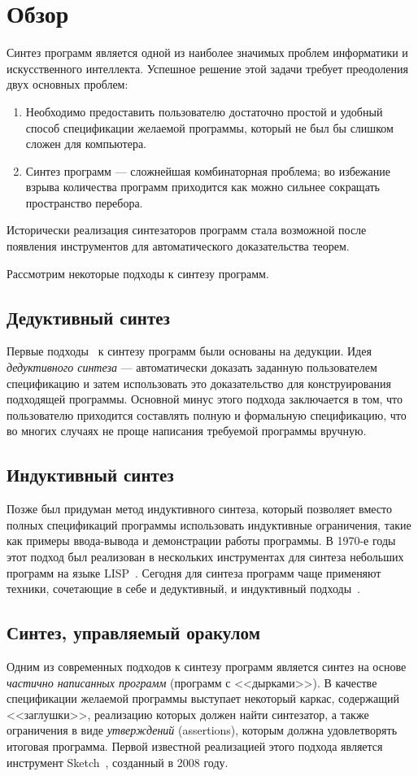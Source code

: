 \documentclass[14pt]{matmex-diploma-custom}
\begin{document}
\section{Обзор}
Синтез программ является одной из наиболее значимых проблем информатики и искусственного интеллекта. Успешное решение этой задачи требует преодоления двух основных проблем:
\begin{enumerate}
    \item Необходимо предоставить пользователю достаточно простой и удобный способ спецификации желаемой программы, который не был бы слишком сложен для компьютера.
    \item Синтез программ --- сложнейшая комбинаторная проблема; во избежание взрыва количества программ приходится как можно сильнее сокращать пространство перебора.
\end{enumerate}

Исторически реализация синтезаторов программ стала возможной после появления инструментов для автоматического доказательства теорем.

Рассмотрим некоторые подходы к синтезу программ.

\subsection{Дедуктивный синтез}
Первые подходы~\cite{deductive1, Zohar} к синтезу программ были основаны на дедукции. Идея \emph{дедуктивного синтеза} --- автоматически доказать заданную пользователем спецификацию и затем использовать это доказательство для конструирования подходящей программы. Основной минус этого подхода заключается в том, что пользователю приходится составлять полную и формальную спецификацию, что во многих случаях не проще написания требуемой программы вручную.

\subsection{Индуктивный синтез}
Позже был придуман метод индуктивного синтеза, который позволяет вместо полных спецификаций программы использовать индуктивные ограничения, такие как примеры ввода-вывода и демонстрации работы программы. В 1970-е годы этот подход был реализован в нескольких инструментах для синтеза небольших программ на языке LISP~\cite{Shaw}. Сегодня для синтеза программ чаще применяют техники, сочетающие в себе и дедуктивный, и индуктивный подходы~\cite{ProgramSynthesis}.

\subsection{Синтез, управляемый оракулом}
Одним из современных подходов к синтезу программ является синтез на основе \emph{частично написанных программ} (программ с <<дырками>>). В качестве спецификации желаемой программы выступает некоторый каркас, содержащий <<заглушки>>, реализацию которых должен найти синтезатор, а также ограничения в виде \emph{утверждений} (assertions), которым должна удовлетворять итоговая программа. Первой известной реализацией этого подхода является инструмент Sketch~\cite{Solar-Lezama}, созданный в 2008 году.
\end{document}
